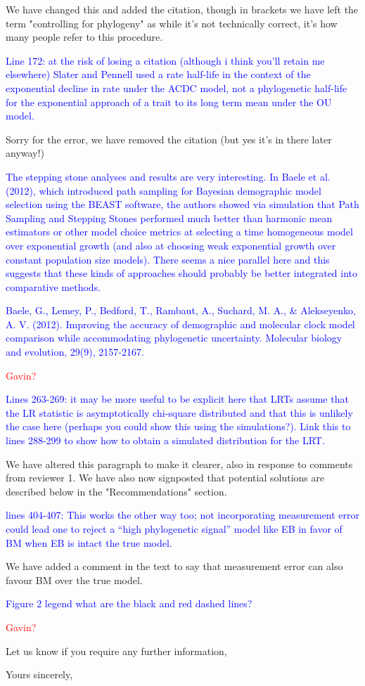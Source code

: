 \documentclass[12pt]{letter}
\begin{document}
\begin{letter}{}
We have changed this and added the citation, though in brackets we have left the term "controlling for phylogeny"
 as while it's not technically correct, it's how many people refer to this procedure.

\textcolor{blue}{Line 172: at the risk of losing a citation (although i think you’ll retain me elsewhere) Slater and Pennell used a rate half-life in the context of the exponential decline in rate under the ACDC model, not a phylogenetic half-life for the exponential approach of a trait to its long term mean under the OU model.}

Sorry for the error, we have removed the citation (but yes it's in there later anyway!)

\textcolor{blue}{The stepping stone analyses and results are very interesting. In Baele et al. (2012), which introduced path sampling for Bayesian demographic model selection using the BEAST software, the authors showed via simulation that Path Sampling and Stepping Stones performed much better than harmonic mean estimators or other model choice metrics at selecting a time homogeneous model over exponential growth (and also at choosing weak exponential growth over constant population size models). There seems a nice parallel here and this suggests that these kinds of approaches should probably be better integrated into comparative methods.}

\textcolor{blue}{Baele, G., Lemey, P., Bedford, T., Rambaut, A., Suchard, M. A., \& Alekseyenko, A. V. (2012). Improving the accuracy of demographic and molecular clock model comparison while accommodating phylogenetic uncertainty. Molecular biology and evolution, 29(9), 2157-2167.}

\textcolor{red}{Gavin?}

\textcolor{blue}{Lines 263-269: it may be more useful to be explicit here that LRTs assume that the LR statistic is asymptotically chi-square distributed and that this is unlikely the case here (perhaps you could show this using the simulations?). Link this to lines 288-299 to show how to obtain a simulated distribution for the LRT.}

We have altered this paragraph to make it clearer, also in response to comments from reviewer 1. We have also now signposted that potential solutions are described below in the "Recommendations" section.

\textcolor{blue}{lines 404-407: This works the other way too; not incorporating measurement error could lead one to reject a “high phylogenetic signal” model like EB in favor of BM when EB is intact the true model.}

We have added a comment in the text to say that measurement error can also favour BM over the true model.

\textcolor{blue}{Figure 2 legend what are the black and red dashed lines?}

\textcolor{red}{Gavin?}

Let us know if you require any further information,

\closing{Yours sincerely,}

\end{letter}
\end{document}
